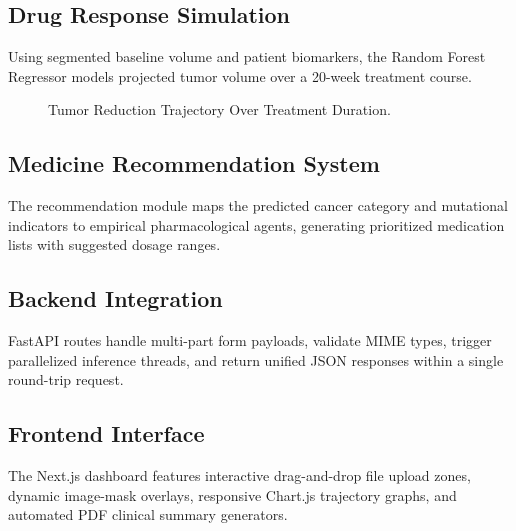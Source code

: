 \documentclass[conference]{IEEEtran}
\begin{document}
\subsection{Drug Response Simulation}
Using segmented baseline volume and patient biomarkers, the Random Forest Regressor models projected tumor volume over a 20-week treatment course.

\begin{figure}[htbp]
\centering
{}
\caption{Tumor Reduction Trajectory Over Treatment Duration.}
\label{fig:response_curve}
\end{figure}

\subsection{Medicine Recommendation System}
The recommendation module maps the predicted cancer category and mutational indicators to empirical pharmacological agents, generating prioritized medication lists with suggested dosage ranges.

\subsection{Backend Integration}
FastAPI routes handle multi-part form payloads, validate MIME types, trigger parallelized inference threads, and return unified JSON responses within a single round-trip request.

\subsection{Frontend Interface}
The Next.js dashboard features interactive drag-and-drop file upload zones, dynamic image-mask overlays, responsive Chart.js trajectory graphs, and automated PDF clinical summary generators.
\end{document}

